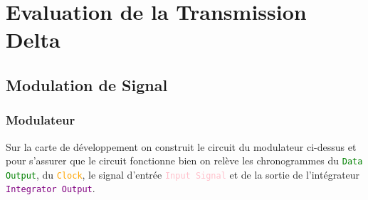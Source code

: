\documentclass[11pt, openright]{book}
\begin{document}





\newpage


\section{Evaluation de la Transmission Delta}

\subsection{Modulation de Signal}

\subsubsection{Modulateur}
\begin{figure}[ht]
    \begin{floatrow}


    \end{floatrow}
\end{figure}

Sur la carte de développement on construit le circuit du modulateur ci-dessus et pour s'assurer que le circuit fonctionne bien on relève les chronogrammes du \textcolor{green}{\texttt{Data Output}}, du \textcolor{orange}{\texttt{Clock}}, le signal d'entrée \textcolor{pink}{\texttt{Input Signal}} et de la sortie de l'intégrateur \textcolor{purple}{\texttt{Integrator Output}}.
\end{document}
